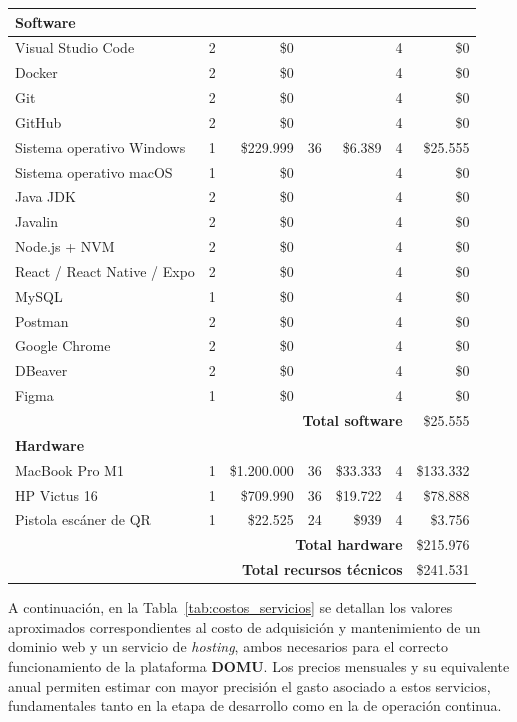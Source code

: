 {\begin{table}[H]
{\begin{tabular}{|p{}|c|r|c|r|c|r|}
    \multicolumn{7}{|l|}{\textbf{Software}}\\ \hline
    Visual Studio Code & 2 & \$0 & & & 4 & \$0\\
    Docker & 2 & \$0 & & & 4 & \$0\\
    Git & 2 & \$0 & & & 4 & \$0\\
    GitHub & 2 & \$0 & & & 4 & \$0\\
    Sistema operativo Windows & 1 & \$229.999 & 36 & \$6.389 & 4 & \$25.555\\
    Sistema operativo macOS & 1 & \$0 & & & 4 & \$0\\
    Java JDK & 2 & \$0 & & & 4 & \$0\\
    Javalin & 2 & \$0 & & & 4 & \$0\\
    Node.js + NVM & 2 & \$0 & & & 4 & \$0\\
    React / React Native / Expo & 2 & \$0 & & & 4 & \$0\\
    MySQL & 1 & \$0 & & & 4 & \$0\\
    Postman & 2 & \$0 & & & 4 & \$0\\
    Google Chrome & 2 & \$0 & & & 4 & \$0\\
    DBeaver & 2 & \$0 & & & 4 & \$0\\
    Figma & 1 & \$0 & & & 4 & \$0\\ \hline
    \multicolumn{6}{|r|}{\textbf{Total software}} & \$25.555\\
    \hline \hline %
    \multicolumn{7}{|l|}{\textbf{Hardware}}\\ \hline
    MacBook Pro M1 & 1 & \$1.200.000 & 36 & \$33.333 & 4 & \$133.332\\
    HP Victus 16 & 1 & \$709.990 & 36 & \$19.722 & 4 & \$78.888\\
    Pistola escáner de QR & 1 & \$22.525 & 24 & \$939 & 4 & \$3.756\\ \hline
    \multicolumn{6}{|r|}{\textbf{Total hardware}} & \$215.976\\
    \hline \hline %
    \multicolumn{6}{|r|}{\textbf{Total recursos técnicos}} & \$241.531\\
    \hline
    
    \end{tabular}
    } %
\end{table}

A continuación, en la Tabla~\ref{tab:costos_servicios} se detallan los valores aproximados correspondientes al costo de adquisición y mantenimiento de un dominio web y un servicio de \textit{hosting}, ambos necesarios para el correcto funcionamiento de la plataforma \textbf{DOMU}. Los precios mensuales y su equivalente anual permiten estimar con mayor precisión el gasto asociado a estos servicios, fundamentales tanto en la etapa de desarrollo como en la de operación continua.

}
